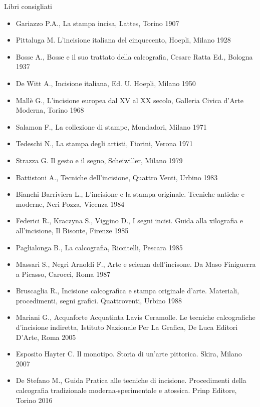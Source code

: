 \documentclass[hidelinks,aspectratio=169]{beamer}
\begin{document}
	\begin{frame}{Libri consigliati}
		\begin{itemize}
			\item \tiny{Gariazzo P.A., La stampa incisa, Lattes, Torino 1907}
			\item \tiny{Pittaluga M. L’incisione italiana del cinquecento, Hoepli, Milano 1928}
			\item \tiny{Bosse A., Bosse e il suo trattato della calcografia, Cesare Ratta Ed., Bologna 1937}
			\item \tiny{De Witt A., Incisione italiana, Ed. U. Hoepli, Milano 1950}
			\item \tiny{Mallè G., L’incisione europea dal XV al XX secolo, Galleria Civica d’Arte Moderna, Torino 1968}
			\item \tiny{Salamon F., La collezione di stampe, Mondadori, Milano 1971}
			\item \tiny{Tedeschi N., La stampa degli artisti, Fiorini, Verona 1971}
			\item \tiny{Strazza G. Il gesto e il segno, Scheiwiller, Milano 1979}
			\item \tiny{Battistoni A., Tecniche dell’incisione, Quattro Venti, Urbino 1983}
			\item \tiny{Bianchi Barriviera L., L’incisione e la stampa originale. Tecniche antiche e moderne, Neri Pozza, Vicenza 1984}
			\item \tiny{Federici R., Kraczyna S., Viggino D., I segni incisi. Guida alla xilografia e all’incisione, Il Bisonte, Firenze 1985}
			\item \tiny{Paglialonga B., La calcografia, Riccitelli, Pescara 1985}
			\item \tiny{Massari S., Negri Arnoldi F., Arte e scienza dell’incisone. Da Maso Finiguerra a Picasso, Carocci, Roma 1987}
			\item \tiny{Bruscaglia R., Incisione calcografica e stampa originale d’arte. Materiali, procedimenti, segni grafici. Quattroventi, Urbino 1988}
			\item \tiny{Mariani G., Acquaforte Acquatinta Lavis Ceramolle. Le tecniche calcografiche d’incisione indiretta, Istituto Nazionale Per La Grafica, De Luca Editori D’Arte, Roma 2005}
			\item \tiny{Esposito Hayter C. Il monotipo. Storia di un’arte pittorica. Skira, Milano 2007}
			\item \tiny{De Stefano M., Guida Pratica alle tecniche di incisione. Procedimenti della calcografia tradizionale moderna-sperimentale e atossica. Prinp Editore, Torino 2016}
		\end{itemize}
		

\end{frame}
\end{document}
